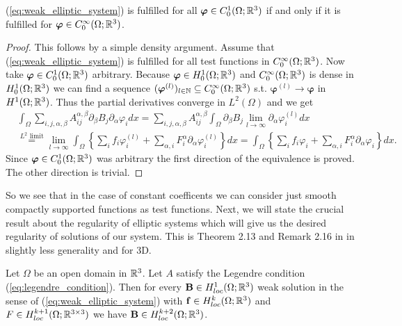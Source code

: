\documentclass[../master_thesis.tex]{subfiles}
\begin{document}
\begin{proposition}\label{prop:weak_solution_smooth_test_functions}
    (\ref{eq:weak_elliptic_system}) is fulfilled for all 
    $\bm{\varphi} \in C^1_0(\Omega;\mathbb{R}^3)$ if and only if it is fulfilled 
    for $\bm{\varphi} \in C^\infty_0(\Omega;\mathbb{R}^3)$.
\end{proposition}
\begin{proof}
    This follows by a simple density argument. Assume that 
    (\ref{eq:weak_elliptic_system}) is fulfilled for all test functions in 
    $C^\infty_0(\Omega;\mathbb{R}^3)$. Now take $\bm{\varphi} \in C^1_0(\Omega;\mathbb{R}^3)$
    arbitrary. Because $\bm{\varphi} \in H_0^1(\Omega;\mathbb{R}^3)$ and 
    $C^\infty_0(\Omega;\mathbb{R}^3)$ is dense in $H_0^1(\Omega;\mathbb{R}^3)$ we can find 
    a sequence $(\bm{\varphi}^{(l)})_{l \in \mathbb{N}} \subseteq 
    C^\infty_0(\Omega;\mathbb{R}^3)$ s.t. $\bm{\varphi}^{(l)} \rightarrow \bm{\varphi}$
    in $H^1(\Omega;\mathbb{R}^3)$. Thus the partial derivatives converge in $L^2(\Omega)$
    and we get
    \begin{align*}
        &\int_\Omega \sum\limits_{i,j,\alpha,\beta} 
            A_{ij}^{\alpha, \beta} \partial_\beta B_j \partial_\alpha \varphi_i
            dx
        = \sum\limits_{i,j,\alpha,\beta} A_{ij}^{\alpha, \beta}
            \int_\Omega \partial_\beta B_j \lim\limits_{l\rightarrow \infty} 
            \partial_\alpha \varphi_i^{(l)} dx
        \\ &\stackrel{\text{$L^2$ limit}}{=} 
            \lim\limits_{l\rightarrow \infty} 
            \int_\Omega \left\{ \sum\limits_i f_i \varphi^{(l)}_i + 
            \sum\limits_{\alpha,i} F_i^\alpha \partial_\alpha \varphi^{(l)}_i 
            \right\} dx
        = \int_\Omega \left\{ \sum\limits_i f_i \varphi_i + 
            \sum\limits_{\alpha,i} F_i^\alpha \partial_\alpha \varphi_i 
            \right\} dx.
    \end{align*}
    Since $\bm{\varphi} \in C_0^1(\Omega;\mathbb{R}^3)$ was arbitrary the first 
    direction of the equivalence is proved. The other direction is trivial.
\end{proof}
So we see that in the case of constant coefficents we can consider 
just smooth compactly supported functions as test functions.
Next, we will state the crucial result about the regularity of elliptic systems
which will give us the desired regularity of solutions of our system. This is Theorem 2.13 and Remark 2.16 
in \cite{lectures_on_elliptic_pdes} in slightly less generality and for 3D.
\begin{theorem}\label{thm:regularity_elliptic_systems}
    Let $\Omega$ be an open domain in $\mathbb{R}^3$. Let $A$ 
    satisfy the Legendre condition (\ref{eq:legendre_condition}). Then for every 
    $\mathbf{B} \in H^1_{loc}(\Omega;\mathbb{R}^3)$ weak solution in the sense of
    (\ref{eq:weak_elliptic_system}) with $\mathbf{f} \in H^k_{loc}(\Omega;\mathbb{R}^3)$ and 
    $F \in H^{k+1}_{loc}(\Omega;\mathbb{R}^{3\times 3})$ 
    we have $\mathbf{B} \in H^{k+2}_{loc}(\Omega;\mathbb{R}^3)$. 
\end{theorem}
\end{document}

